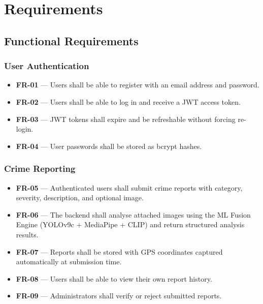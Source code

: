 \documentclass[12pt,a4paper]{report}
\begin{document}
\chapter{Requirements}

\section{Functional Requirements}

\subsection{User Authentication}
\begin{itemize}[leftmargin=*]
    \item \textbf{FR-01} — Users shall be able to register with an email address and password.
    \item \textbf{FR-02} — Users shall be able to log in and receive a JWT access token.
    \item \textbf{FR-03} — JWT tokens shall expire and be refreshable without forcing re-login.
    \item \textbf{FR-04} — User passwords shall be stored as bcrypt hashes.
\end{itemize}

\subsection{Crime Reporting}
\begin{itemize}[leftmargin=*]
    \item \textbf{FR-05} — Authenticated users shall submit crime reports with category, severity, description, and optional image.
    \item \textbf{FR-06} — The backend shall analyse attached images using the ML Fusion Engine (YOLOv9c + MediaPipe + CLIP) and return structured analysis results.
    \item \textbf{FR-07} — Reports shall be stored with GPS coordinates captured automatically at submission time.
    \item \textbf{FR-08} — Users shall be able to view their own report history.
    \item \textbf{FR-09} — Administrators shall verify or reject submitted reports.
\end{itemize}
\end{document}
